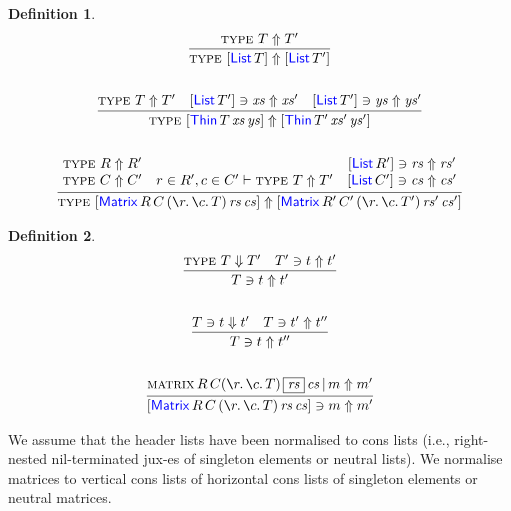 \documentclass[12pt, a4paper]{article}
\makeatletter
\newcommand{\bsl}{\texttt{\symbol{92}}}
\newcommand{\Nil}{\mathbf{[]}}
\newcommand{\itAtom}{\mathsf{it}}
\newcommand{\gp}{\,}
\newcommand{\elimOne}[1]{\gp \textcolor{ForestGreen}{#1}}
\newcommand{\subst}[2]{{#1}\lfloor {#2} \rfloor}
\newcommand{\substfor}[3]{\subst{#1}{ {#2} / {#3} }}
\newcommand{\C}[1]{\textcolor{red}{\mathsf{#1}}}
\newcommand{\D}[1]{\textcolor{blue}{\mathsf{#1}}}
\newcommand{\one}[1]{[ \C{one} \gp  {#1} ]}
\newcommand{\List}[1]{[ \D{List} \gp {#1} ]}
\newcommand{\Matrix}[7]{[ \D{Matrix} \gp {#1} \gp {#2} \gp ( \la{#3}\la{#4} {#5}) \gp {#6} \gp {#7}]}
\newcommand{\MRCT}[2]{\Matrix{R}{C}{r}{c}{T}{#1}{#2}}
\newcommand{\jux}[2]{[ \C{jux} \gp {#1} \gp {#2}]}
\newcommand{\Thin}[3]{[ \D{Thin} \gp {#1} \gp {#2} \gp {#3} ]}
\newcommand{\itElim}[1]{{#1} \gp \elimOne{\itAtom}}
\newcommand{\rad}[2]{({#1} \!::\! {#2})}
\newcommand{\la}[1]{\bsl{#1}.\,}
\newcommand{\V}[1]{\mathit{#1}}
\newcommand{\etaexp}{\Uparrow}
\newcommand{\typexp}[2]{\textsc{type} \gp \gp {#1} \etaexp {#2}}
\newcommand{\chkexp}[3]{{#1} \ni {#2} \etaexp {#3}}
\newcommand{\steps}{\Downarrow}
\newcommand{\typesteps}[2]{\textsc{type} \gp \gp {#1} \steps {#2}}
\newcommand{\chksteps}[3]{{#1} \ni {#2} \steps {#3}}
\newcommand{\rowjudg}[4]{\textsc{matrix} \gp R \gp C (\la{r}\la{c} {T}) \gp
    \fbox{\ensuremath{#1}} \gp {#2} \gp | \gp {#3}  \etaexp {#4}}
\newtheorem{dfn}{Definition}
\newcommand{\stackprem}[1]{
  \begin{array}[b]{@{}c@{}}
  #1
  \end{array}
}
\makeatother
\begin{document}
\begin{dfn}
  \begin{gather*}
   \infer{\typexp{\List{T}}{\List{T'}}}{\typexp{T}{T'}} \\ \\
   \infer
     {\typexp{\Thin{T}{\V{xs}}{\V{ys}}}{\Thin{T'}{\V{xs'}}{\V{ys'}}}}
     {\typexp{T}{T'}
       & \chkexp{\List{T'}}{\V{xs}}{\V{xs'}}
       & \chkexp{\List{T'}}{\V{ys}}{\V{ys'}}
     } \\ \\
   \infer
     {\typexp{\MRCT{\V{rs}}{\V{cs}}}{\Matrix{R'}{C'}{r}{c}{T'}{\V{rs'}}{\V{cs'}}}}
     { \stackprem{\typexp{R}{R'} \\ \typexp{C}{C'}}
       & r \in R', c \in C' \vdash \typexp{T}{T'}
       & \stackprem{
           \chkexp{\List{R'}}{\V{rs}}{\V{rs'}}\\
           \chkexp{\List{C'}}{\V{cs}}{\V{cs'}}
         }
     }
 \end{gather*}
\end{dfn}

\begin{dfn}
  \begin{gather*}
    \infer{\chkexp{T}{t}{t'}}{\typesteps{T}{T'} & \chkexp{T'}{t}{t'}}\\ \\
    \infer{\chkexp{T}{t}{t''}}{\chksteps{T}{t}{t'} & \chkexp{T}{t'}{t''}}\\ \\
    \infer{\chkexp{\Matrix{R}{C}{r}{c}{T}{\V{rs}}{\V{cs}}}{m}{m'}}
    {\rowjudg{\V{rs}}{\V{cs}}{m}{m'}}
  \end{gather*}
\end{dfn}

We assume that the header lists have been normalised to cons lists (i.e., right-nested nil-terminated jux-es of singleton elements or neutral lists). We normalise matrices to vertical cons lists of horizontal cons lists of singleton elements or neutral matrices.
\end{document}
